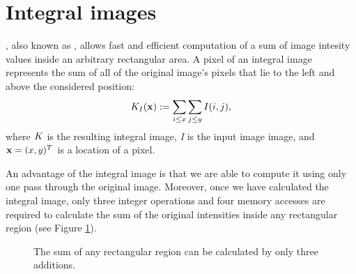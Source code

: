 \section{Integral images}

, also known as , allows fast and efficient computation of a sum of image intesity values inside an arbitrary rectangular area.
A pixel of an integral image represents the sum of all of the original image's pixels that lie to the left and above the considered position: 
\begin{equation*}
K_I(\mathbf{x}) := \sum_{i \le x} \sum_{j \le y} I(i,j),
\end{equation*}
where $K$ is the resulting integral image, \emph{I} is the input image image, and $\mathbf{x} = (x, y)^{T}$ is a location of a pixel.

An advantage of the integral image is that we are able to compute it using only one pass through the original image. 
Moreover, once we have calculated the integral image, only three integer operations and four memory accesses are required to calculate the sum 
of the original intensities inside any rectangular region (see Figure \ref{fig:integral}).

\begin{figure}[h]
  \caption{The sum of any rectangular region can be calculated by only three additions. }
  \label{fig:integral}
\end{figure}
